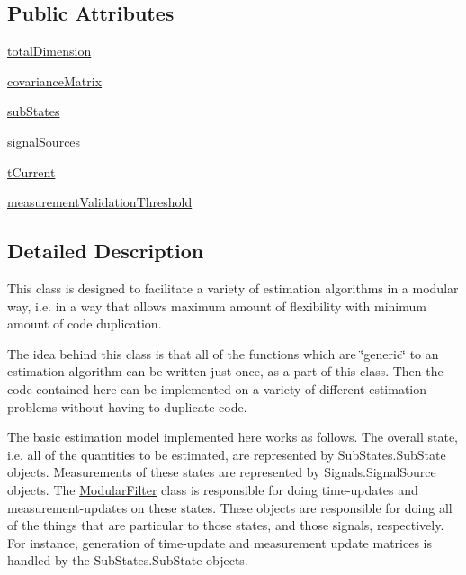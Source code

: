 \subsection*{Public Attributes}
\begin{DoxyCompactItemize}
\item 
\hyperlink{classmodest_1_1ModularFilter_1_1ModularFilter_a64f808a716a429e6767ef4b6990e8bb7}{total\+Dimension}
\item 
\hyperlink{classmodest_1_1ModularFilter_1_1ModularFilter_ad066e28be9d21786c3974da095d9e010}{covariance\+Matrix}
\item 
\hyperlink{classmodest_1_1ModularFilter_1_1ModularFilter_a1d37c415d645706e55e6ef54726e33d3}{sub\+States}
\item 
\hyperlink{classmodest_1_1ModularFilter_1_1ModularFilter_ac313b234b8149764c943a1727a4b9056}{signal\+Sources}
\item 
\hyperlink{classmodest_1_1ModularFilter_1_1ModularFilter_aa084950b3ec64691d1cb1136729032b5}{t\+Current}
\item 
\hyperlink{classmodest_1_1ModularFilter_1_1ModularFilter_ae3903876f8bd6b45e7630c53e126b29c}{measurement\+Validation\+Threshold}
\end{DoxyCompactItemize}


\subsection{Detailed Description}
This class is designed to facilitate a variety of estimation algorithms in a modular way, i.\+e. in a way that allows maximum amount of flexibility with minimum amount of code duplication.

The idea behind this class is that all of the functions which are \char`\"{}generic\char`\"{} to an estimation algorithm can be written just once, as a part of this class. Then the code contained here can be implemented on a variety of different estimation problems without having to duplicate code.

The basic estimation model implemented here works as follows. The overall state, i.\+e. all of the quantities to be estimated, are represented by Sub\+States.\+Sub\+State objects. Measurements of these states are represented by Signals.\+Signal\+Source objects. The \hyperlink{classmodest_1_1ModularFilter_1_1ModularFilter}{Modular\+Filter} class is responsible for doing time-\/updates and measurement-\/updates on these states. These objects are responsible for doing all of the things that are particular to those states, and those signals, respectively. For instance, generation of time-\/update and measurement update matrices is handled by the Sub\+States.\+Sub\+State objects. 

